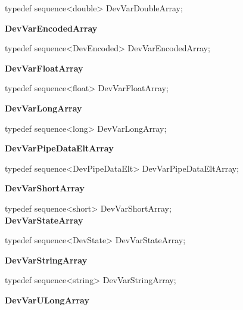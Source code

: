 typedef sequence<double> DevVarDoubleArray;\\

\begin{flushleft}
\textbf{DevVarEncodedArray}
\par\end{flushleft}

typedef sequence<DevEncoded> DevVarEncodedArray;\\

\begin{flushleft}
\textbf{DevVarFloatArray}
\par\end{flushleft}

typedef sequence<float> DevVarFloatArray;\\

\begin{flushleft}
\textbf{DevVarLongArray}
\par\end{flushleft}

typedef sequence<long> DevVarLongArray;\\

\begin{flushleft}
\textbf{DevVarPipeDataEltArray}
\par\end{flushleft}

typedef sequence<DevPipeDataElt> DevVarPipeDataEltArray;\\

\begin{flushleft}
\textbf{DevVarShortArray}
\par\end{flushleft}

typedef sequence<short> DevVarShortArray;\\

\textbf{DevVarStateArray}

typedef sequence<DevState> DevVarStateArray;\\

\begin{flushleft}
\textbf{DevVarStringArray}
\par\end{flushleft}

typedef sequence<string> DevVarStringArray;\\

\begin{flushleft}
\textbf{DevVarULongArray}
\par\end{flushleft}

